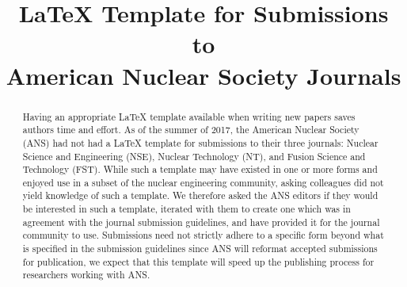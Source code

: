 \documentclass{style/nseJournal}
\begin{document}
\title{{\LaTeX} Template for Submissions to \\American Nuclear Society Journals} %

{}
{}

{}


\titlePage

\begin{abstract}
Having an appropriate {\LaTeX} template available when writing new papers saves authors time and effort.
As of the summer of 2017, the American Nuclear Society (ANS) had not had a {\LaTeX} template for submissions to their three journals: Nuclear Science and Engineering (NSE), Nuclear Technology (NT), and Fusion Science and Technology (FST).
While such a template may have existed in one or more forms and enjoyed use in a subset of the nuclear engineering community, asking colleagues did not yield knowledge of such a template.
We therefore asked the ANS editors if they would be interested in such a template, iterated with them to create one which was in agreement with the journal submission guidelines, and have provided it for the journal community to use.
Submissions need not strictly adhere to a specific form beyond what is specified in the submission guidelines since ANS will reformat accepted submissions for publication, we expect that this template will speed up the publishing process for researchers working with ANS.
\end{abstract}
\end{document}
